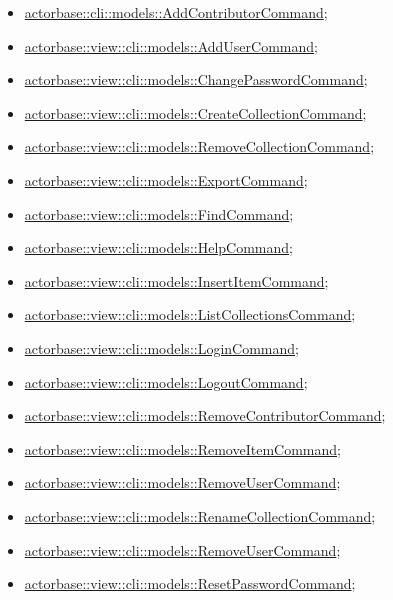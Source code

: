 \documentclass{scalatekids-article}
\begin{document}
\begin{itemize}
\item \hyperref[sec:actorbase::cli::models::AddContributorCommand]{actorbase::cli::models::AddContributorCommand};
\item \hyperref[sec:actorbase::view::cli::models::AddUserCommand]{actorbase::view::cli::models::AddUserCommand};
\item  \hyperref[sec:actorbase::view::cli::models::ChangePasswordCommand]{actorbase::view::cli::models::ChangePasswordCommand};
\item  \hyperref[sec:actorbase::view::cli::models::CreateCollectionCommand]{actorbase::view::cli::models::CreateCollectionCommand};
\item  \hyperref[sec:actorbase::view::cli::models::RemoveCollectionCommand]{actorbase::view::cli::models::RemoveCollectionCommand};
\item  \hyperref[sec:actorbase::view::cli::models::ExportCommand]{actorbase::view::cli::models::ExportCommand};
\item  \hyperref[sec:actorbase::view::cli::models::FindCommand]{actorbase::view::cli::models::FindCommand};
\item  \hyperref[sec:actorbase::view::cli::models::HelpCommand]{actorbase::view::cli::models::HelpCommand};
\item  \hyperref[sec:actorbase::view::cli::models::InsertItemCommand]{actorbase::view::cli::models::InsertItemCommand};
\item  \hyperref[sec:actorbase::view::cli::models::ListCollectionsCommand]{actorbase::view::cli::models::ListCollectionsCommand};
\item  \hyperref[sec:actorbase::view::cli::models::LoginCommand]{actorbase::view::cli::models::LoginCommand};
\item  \hyperref[sec:actorbase::view::cli::models::LogoutCommand]{actorbase::view::cli::models::LogoutCommand};
\item  \hyperref[sec:actorbase::view::cli::models::RemoveContributorCommand]{actorbase::view::cli::models::RemoveContributorCommand};
\item  \hyperref[sec:actorbase::view::cli::models::RemoveItemCommand]{actorbase::view::cli::models::RemoveItemCommand};
\item  \hyperref[sec:actorbase::view::cli::models::RemoveUserCommand]{actorbase::view::cli::models::RemoveUserCommand};
\item  \hyperref[sec:actorbase::view::cli::models::RenameCollectionCommand]{actorbase::view::cli::models::RenameCollectionCommand};
\item  \hyperref[sec:actorbase::view::cli::models::RemoveUserCommand]{actorbase::view::cli::models::RemoveUserCommand};
\item  \hyperref[sec:actorbase::view::cli::models::ResetPasswordCommand]{actorbase::view::cli::models::ResetPasswordCommand};
\end{itemize}
\end{document}
